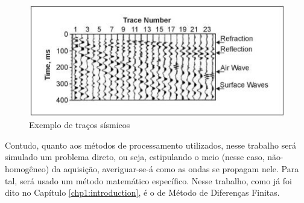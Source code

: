 \begin{figure}[H]
	\centering
	\includegraphics[scale=3.]{chapters/chp2/images/seismic-traces.jpg}
	\caption{Exemplo de traços sísmicos}
	\label{fig:seismic-traces}
\end{figure}

Contudo, quanto aos métodos de processamento utilizados, nesse
trabalho será simulado um problema
direto, ou seja, estipulando o meio (nesse caso, não-homogêneo) da aquisição,
averiguar-se-á como as ondas se propagam nele. Para tal, será usado um método
matemático específico. Nesse trabalho, como já foi dito no Capítulo
\ref{chp1:introduction}, é o de Método de Diferenças Finitas.